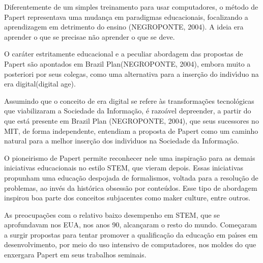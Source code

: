 \documentclass[
12pt,		%
openright,	%
twoside,  %
a4paper,			%
chapter=TITLE,		%
english,			%
french,				%
spanish,			%
brazil				%
]{USPSC-classe/USPSC}
\begin{document}
Diferentemente de um simples treinamento para usar computadores, o m\'etodo de Papert representava uma mudan\c{c}a em paradigmas educacionais, focalizando a aprendizagem em detrimento do ensino  (NEGROPONTE, 2004). A ideia era \textquotedbl aprender o que se precisa\textquotedbl  e n\~ao \textquotedbl aprender o que se deve\textquotedbl .








O car\'ater estritamente educacional e a peculiar abordagem das propostas de Papert s\~ao apontados em \textquotedbl Brazil Plan\textquotedbl   (NEGROPONTE, 2004), embora muito a posteriori por seus colegas, como uma alternativa para a inser\c{c}\~ao do indiv\'{\i}duo na \textquotedbl era digital\textquotedbl  (digital age).








Assumindo que o conceito de \textquotedbl era digital \textquotedbl  se refere \`as transforma\c{c}\~oes tecnol\'ogicas que viabilizaram a \textquotedbl Sociedade da Informa\c{c}\~ao\textquotedbl ,  \'e razo\'avel depreender, a partir do que est\'a presente em Brazil Plan  (NEGROPONTE, 2004), que seus sucessores no MIT, de forma independente, entendiam a proposta de Papert como um caminho natural para a melhor inser\c{c}\~ao dos indiv\'{\i}duos na Sociedade da Informa\c{c}\~ao.








O pioneirismo de Papert permite reconhecer nele uma inspira\c{c}\~ao para as demais iniciativas educacionais no estilo STEM, que vieram depois. Essas iniciativas propunham uma educa\c{c}\~ao despojada de formalismos, voltada para a resolu\c{c}\~ao de problemas, ao inv\'es da hist\'orica obsess\~ao por conte\'udos. Esse tipo de abordagem inspirou boa parte dos conceitos subjacentes como \textquotedbl maker culture\textquotedbl , entre outros.








As preocupa\c{c}\~oes com o relativo baixo desempenho em STEM, que se aprofundavam nos EUA, nos anos 90, alcan\c{c}aram o resto do mundo. Come\c{c}aram a surgir propostas para tentar promover a qualifica\c{c}\~ao da educa\c{c}\~ao em pa\'{\i}ses em desenvolvimento, por meio do uso intensivo de computadores, nos moldes do que enxergara Papert em seus trabalhos seminais.
\end{document}
